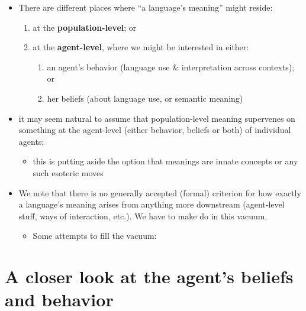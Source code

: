 \documentclass[fleqn,reqno,10pt]{article}
\begin{document}
\begin{itemize}
\item There are different places where ``a language's meaning'' might reside:
  \begin{enumerate}
  \item at the \textbf{population-level}; or
  \item at the \textbf{agent-level}, where we might be interested in either:
  \begin{enumerate}
    \item an agent's behavior (language use \& interpretation across contexts); or
    \item her beliefs (about language use, or semantic meaning)
  \end{enumerate}
\end{enumerate}
\item it may seem natural to assume that population-level meaning supervenes on something at
  the agent-level (either behavior, beliefs or both) of individual agents;
  \begin{itemize}
  \item this is putting aside the option that meanings are innate concepts or any such
    esoteric moves
  \end{itemize}
\item We note that there is no generally accepted (formal) criterion for how exactly a
  language's meaning arises from anything more downstream (agent-level stuff, ways of
  interaction, etc.). We have to make do in this vacuum.
  \begin{itemize}
  \item Some attempts to fill the vacuum:
    \citet{Harms2004:Information-and,Harms2010:Determining-tru,Franke2013:An-adaptationis}
  \end{itemize}

\end{itemize}


\section*{A closer look at the agent's beliefs and behavior}
\end{document}
